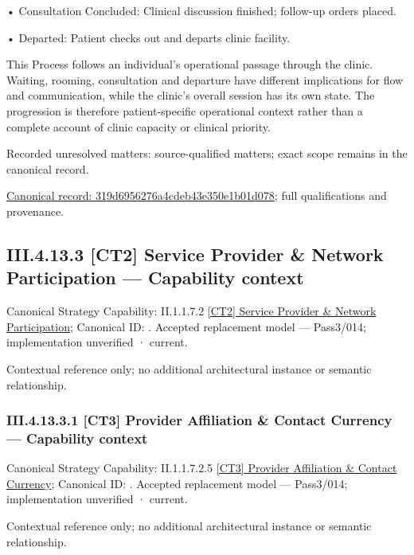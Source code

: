 •
Consultation Concluded: Clinical discussion finished; follow-up orders placed.



•
Departed: Patient checks out and departs clinic facility.



This Process follows an individual's operational passage through the clinic. Waiting, rooming, consultation and departure have different implications for flow and communication, while the clinic's overall session has its own state. The progression is therefore patient-specific operational context rather than a complete account of clinic capacity or clinical priority.


{\small Recorded unresolved matters: source-qualified matters; exact scope remains in the canonical record.}\par
{\footnotesize \href{../../../../../../../continuum/business/business-process/319d6956276a4cdeb43e350e1b01d078.md}{Canonical record: 319d6956276a4cdeb43e350e1b01d078}; full qualifications and provenance.}\par
\subsection*{III.4.13.3 [CT2] Service Provider \& Network Participation — Capability context}
\label{navigation:III.4.13.3}

{\small Canonical Strategy Capability: II.1.1.7.2 \hyperref[element:ceca5f9bdddb4a39bab531595e3547ff]{[CT2] Service Provider \& Network Participation}; Canonical ID: \texttt{}. Accepted replacement model — Pass3/014; implementation unverified · current.}\par
Contextual reference only; no additional architectural instance or semantic relationship.\par
\subsubsection*{III.4.13.3.1 [CT3] Provider Affiliation \& Contact Currency — Capability context}
\label{navigation:III.4.13.3.1}

{\small Canonical Strategy Capability: II.1.1.7.2.5 \hyperref[element:26090bfba56a4a36a7a0f4158ef04c5a]{[CT3] Provider Affiliation \& Contact Currency}; Canonical ID: \texttt{}. Accepted replacement model — Pass3/014; implementation unverified · current.}\par
Contextual reference only; no additional architectural instance or semantic relationship.\par
